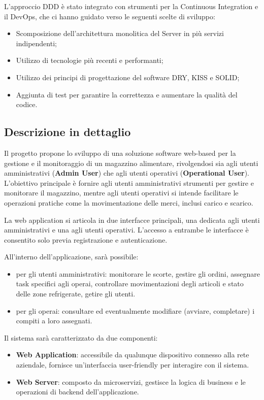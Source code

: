 L'approccio DDD è stato integrato con strumenti per la Continuous Integration e il DevOps, che ci hanno guidato verso le seguenti scelte di sviluppo:
\begin{itemize}
    \item Scomposizione dell’architettura monolitica del Server in più servizi indipendenti;
    \item Utilizzo di tecnologie più recenti e performanti;
    \item Utilizzo dei principi di progettazione del software DRY, KISS e SOLID;
    \item Aggiunta di test per garantire la correttezza e aumentare la qualità del codice.
\end{itemize}
\newpage
\subsection{Descrizione in dettaglio}

Il progetto propone lo sviluppo di una soluzione software web-based per la gestione e il monitoraggio di un magazzino alimentare, rivolgendosi sia agli utenti amministrativi (\textbf{Admin User}) che agli utenti operativi (\textbf{Operational User}). L'obiettivo principale è fornire agli utenti amministrativi strumenti per gestire e monitorare il magazzino, mentre agli utenti operativi si intende facilitare le operazioni pratiche come la movimentazione delle merci, inclusi carico e scarico.

La web application si articola in due interfacce principali, una dedicata agli utenti amministrativi e una agli utenti operativi. L'accesso a entrambe le interfacce è consentito solo previa registrazione e autenticazione.

All'interno dell'applicazione, sarà possibile:
\begin{itemize}
    \item per gli utenti amministrativi: monitorare le scorte, gestire gli ordini, assegnare task specifici agli operai, controllare movimentazioni degli articoli e stato delle zone refrigerate, getire gli utenti.
    \item per gli operai: consultare ed eventualmente modifiare (avviare, completare) i compiti a loro assegnati.
\end{itemize}

Il sistema sarà caratterizzato da due componenti:
\begin{itemize}
    \item \textbf{Web Application}: accessibile da qualunque dispositivo connesso alla rete aziendale, fornisce un'interfaccia user-friendly per interagire con il sistema.
    \item \textbf{Web Server}: composto da microservizi, gestisce la logica di business e le operazioni di backend dell'applicazione.
\end{itemize}
\newpage